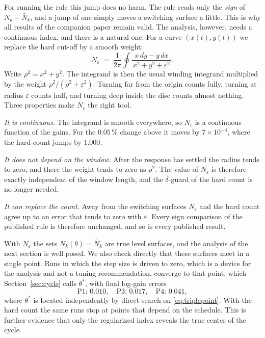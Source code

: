 \documentclass[letterpaper, 10pt, conference, twocolumn]{ieeeconf}
\newcommand{\Nbar}{\bar{N}}
\newcommand{\Neps}{N_{\varepsilon}}
\begin{document}
For running the rule this jump does no harm. The rule reads only the
\emph{sign} of $N_k - \Nbar_k$, and a jump of one simply moves a switching
surface a little. This is why all results of the companion paper remain valid.
The analysis, however, needs a continuous index, and there is a natural one.
For a curve $(x(t), y(t))$ we replace the hard cut-off by a smooth weight:
\begin{equation}
\Neps \;=\; \frac{1}{2\pi} \oint
\frac{x\,dy - y\,dx}{\,x^2 + y^2 + \varepsilon^2\,}.
\label{eq:neps}
\end{equation}
Write $\rho^2 = x^2 + y^2$. The integrand is then the usual winding integrand
multiplied by the weight $\rho^2 / (\rho^2 + \varepsilon^2)$. Turning far from
the origin counts fully, turning at radius $\varepsilon$ counts half, and
turning deep inside the disc counts almost nothing. Three properties make
$\Neps$ the right tool.

\emph{It is continuous.} The integrand is smooth everywhere, so $\Neps$ is a
continuous function of the gains. For the $0.05\,\%$ change above it moves by
$7 \times 10^{-4}$, where the hard count jumps by $1.000$.

\emph{It does not depend on the window.} After the response has settled the
radius tends to zero, and there the weight tends to zero as $\rho^2$. The value
of $\Neps$ is therefore exactly independent of the window length, and the
$\delta$-guard of the hard count is no longer needed.

\emph{It can replace the count.} Away from the switching surfaces $\Neps$ and
the hard count agree up to an error that tends to zero with $\varepsilon$.
Every sign comparison of the published rule is therefore unchanged, and so is
every published result.

With $\Neps$ the sets $N_k(\theta) = \Nbar_k$ are true level surfaces, and the
analysis of the next section is well posed. We also check directly that these
surfaces meet in a single point. Runs in which the step size is driven to zero,
which is a device for the analysis and not a tuning recommendation, converge to
that point, which Section~\ref{sec:cycle} calls $\theta^*$, with final log-gain
errors
\begin{equation*}
\text{P1: } 0.010, \quad \text{P3: } 0.017, \quad \text{P4: } 0.041,
\end{equation*}
where $\theta^*$ is located independently by direct search on
\eqref{eq:triplepoint}. With the hard count the same runs stop at points that
depend on the schedule. This is further evidence that only the regularized
index reveals the true center of the cycle.
\end{document}
